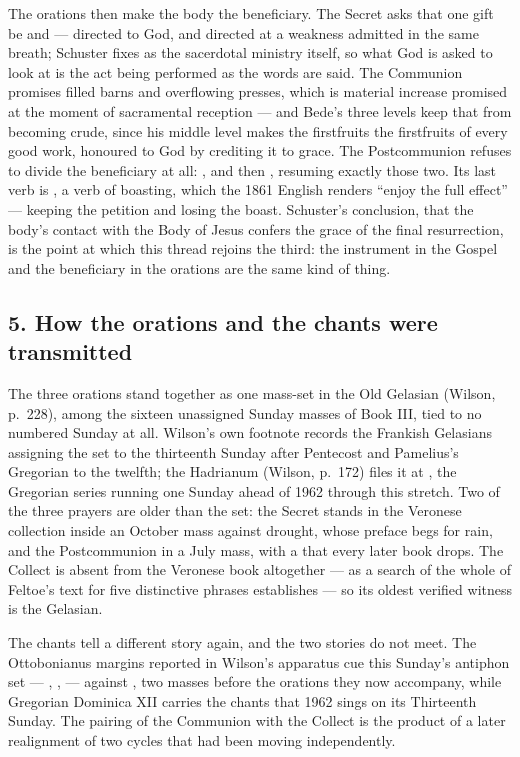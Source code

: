 The orations then make the body the beneficiary. The Secret asks that one gift
be  and  ---
directed to God, and directed at a weakness admitted in the same breath;
Schuster fixes  as the sacerdotal ministry itself, so what
God is asked to look at is the act being performed as the words are said. The
Communion promises filled barns and overflowing presses, which is material
increase promised at the moment of sacramental reception --- and Bede's three
levels keep that from becoming crude, since his middle level makes the
firstfruits the firstfruits of every good work, honoured to God by crediting it
to grace. The Postcommunion refuses to divide the beneficiary at all:
, and then ,
resuming exactly those two. Its last verb is , a verb of
boasting, which the 1861 English renders ``enjoy the full effect'' --- keeping
the petition and losing the boast. Schuster's conclusion, that the body's
contact with the Body of Jesus confers the grace of the final resurrection, is
the point at which this thread rejoins the third: the instrument in the Gospel
and the beneficiary in the orations are the same kind of thing.

\subsection*{5. How the orations and the chants were transmitted}

The three orations stand together as one mass-set in the Old Gelasian (Wilson, p.~228), among the
sixteen unassigned Sunday masses of Book III, tied to no numbered Sunday at
all. Wilson's own footnote records the Frankish Gelasians assigning the set to
the thirteenth Sunday after Pentecost and Pamelius's Gregorian to the twelfth;
the Hadrianum (Wilson, p.~172) files it at , the Gregorian series running one Sunday ahead of 1962 through
this stretch. Two of the three prayers are older than the set: the Secret
stands in the Veronese collection inside an October mass against drought, whose
preface begs for rain, and the Postcommunion in a July mass, with a
 that every later book drops. The Collect is absent from the Veronese
book altogether --- as a search of the whole of Feltoe's text for five
distinctive phrases establishes --- so its oldest verified witness is the
Gelasian.

The chants tell a different story again, and the two stories do not meet. The
Ottobonianus margins reported in Wilson's apparatus cue this Sunday's antiphon
set --- , ,
 --- against , two
masses before the orations they now accompany, while Gregorian Dominica XII
carries the chants that 1962 sings on its Thirteenth Sunday. The pairing of the
 Communion with the  Collect
is the product of a later realignment of two cycles that had been moving
independently.

